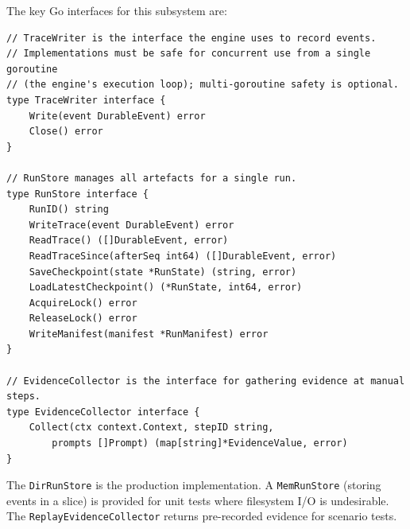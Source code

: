 The key Go interfaces for this subsystem are:

\begin{verbatim}
// TraceWriter is the interface the engine uses to record events.
// Implementations must be safe for concurrent use from a single goroutine
// (the engine's execution loop); multi-goroutine safety is optional.
type TraceWriter interface {
    Write(event DurableEvent) error
    Close() error
}

// RunStore manages all artefacts for a single run.
type RunStore interface {
    RunID() string
    WriteTrace(event DurableEvent) error
    ReadTrace() ([]DurableEvent, error)
    ReadTraceSince(afterSeq int64) ([]DurableEvent, error)
    SaveCheckpoint(state *RunState) (string, error)
    LoadLatestCheckpoint() (*RunState, int64, error)
    AcquireLock() error
    ReleaseLock() error
    WriteManifest(manifest *RunManifest) error
}

// EvidenceCollector is the interface for gathering evidence at manual steps.
type EvidenceCollector interface {
    Collect(ctx context.Context, stepID string,
        prompts []Prompt) (map[string]*EvidenceValue, error)
}
\end{verbatim}

The \texttt{DirRunStore} is the production implementation. A \texttt{MemRunStore} (storing events in a slice) is provided for unit tests where filesystem I/O is undesirable. The \texttt{ReplayEvidenceCollector} returns pre-recorded evidence for scenario tests.

